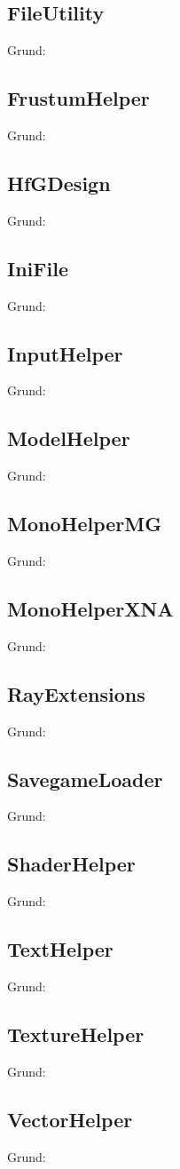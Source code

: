 \subsection{FileUtility}
Grund:
\subsection{FrustumHelper}
Grund:
\subsection{HfGDesign}
Grund:
\subsection{IniFile}
Grund:
\subsection{InputHelper}
Grund:
\subsection{ModelHelper}
Grund:
\subsection{MonoHelperMG}
Grund:
\subsection{MonoHelperXNA}
Grund:
\subsection{RayExtensions}
Grund:
\subsection{SavegameLoader}
Grund:
\subsection{ShaderHelper}
Grund:
\subsection{TextHelper}
Grund:
\subsection{TextureHelper}
Grund:
\subsection{VectorHelper}
Grund:



